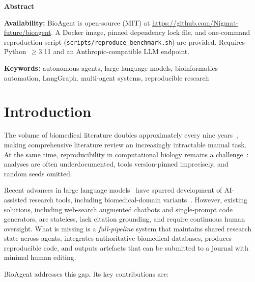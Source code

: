\documentclass[11pt]{article}
\renewenvironment{abstract}{%
  \begin{center}{\bfseries\large Abstract}\end{center}
  \begin{list}{}{%
    \setlength{\leftmargin}{0.4in}%
    \setlength{\rightmargin}{0.4in}}\item\relax\small
}{%
  \end{list}\vspace{0.5ex}%
}
\begin{document}
\begin{abstract}
\textbf{Availability:}
BioAgent is open-source (MIT) at
\url{https://github.com/Nigmat-future/bioagent}.
A Docker image, pinned dependency lock file, and one-command reproduction
script (\texttt{scripts/reproduce\_benchmark.sh}) are provided.
Requires Python~$\geq$3.11 and an Anthropic-compatible LLM endpoint.
\end{abstract}

\noindent
\textbf{Keywords:} autonomous agents, large language models, bioinformatics
automation, LangGraph, multi-agent systems, reproducible research

\section{Introduction}

The volume of biomedical literature doubles approximately every nine
years~\cite{bornmann2015}, making comprehensive literature review an
increasingly intractable manual task.
At the same time, reproducibility in computational biology remains a
challenge~\cite{Piccolo2016,Baker2016}: analyses are often
underdocumented, tools version-pinned imprecisely, and random seeds
omitted.

Recent advances in large language models~\cite{OpenAI2023gpt4,anthropic2024}
have spurred development of AI-assisted research tools, including
biomedical-domain variants~\cite{Lee2023biomedlm}.
However, existing solutions, including web-search augmented chatbots and
single-prompt code generators, are stateless, lack citation grounding, and
require continuous human oversight.
What is missing is a \emph{full-pipeline} system that maintains shared
research state across agents, integrates authoritative biomedical databases,
produces reproducible code, and outputs artefacts that can be submitted to
a journal with minimal human editing.

BioAgent addresses this gap.
Its key contributions are:
\end{document}
